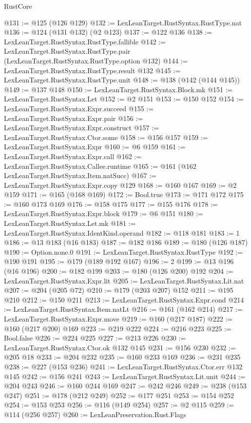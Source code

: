 \begin{lexlean}{RustCore}
\begin{coremodule}
@131 := @125 (@126 @129)
@132 := LexLeanTarget.RustSyntax.RustType.nat
@136 := @124 (@131 @132) (@2 @123)
@137 := @122 @136
@138 := LexLeanTarget.RustSyntax.RustType.fallible
@142 := LexLeanTarget.RustSyntax.RustType.pair (LexLeanTarget.RustSyntax.RustType.option @132)
@144 := LexLeanTarget.RustSyntax.RustType.result @132
@145 := LexLeanTarget.RustSyntax.RustType.unit
@148 := @138 (@142 (@144 @145))
@149 := @137 @148
@150 := LexLeanTarget.RustSyntax.Block.mk
@151 := LexLeanTarget.RustSyntax.Let
@152 := @2 @151
@153 := @150 @152
@154 := LexLeanTarget.RustSyntax.Expr.succeed
@155 := LexLeanTarget.RustSyntax.Expr.pair
@156 := LexLeanTarget.RustSyntax.Expr.construct
@157 := LexLeanTarget.RustSyntax.Ctor.some
@158 := @156 @157
@159 := LexLeanTarget.RustSyntax.Expr
@160 := @6 @159
@161 := LexLeanTarget.RustSyntax.Expr.call
@162 := LexLeanTarget.RustSyntax.Callee.runtime
@165 := @161 (@162 LexLeanTarget.RustSyntax.Item.natSucc)
@167 := LexLeanTarget.RustSyntax.Expr.copy @129
@168 := @160 @167
@169 := @2 @159
@171 := @165 (@168 @169)
@172 := Bool.true
@173 := @171 @172
@175 := @160 @173 @169
@176 := @158 @175
@177 := @155 @176
@178 := LexLeanTarget.RustSyntax.Expr.block
@179 := @6 @151
@180 := LexLeanTarget.RustSyntax.Let.mk
@181 := LexLeanTarget.RustSyntax.IdentKind.operand
@182 := @118 @181
@183 := 1
@186 := @13 @183 (@16 @183)
@187 := @182 @186
@189 := @180 (@126 @187)
@190 := Option.none.{0}
@191 := LexLeanTarget.RustSyntax.RustType
@192 := @190 @191
@195 := @179 (@189 @192 @167)
@196 := 2
@199 := @13 @196 (@16 @196)
@200 := @182 @199
@203 := @180 (@126 @200) @192
@204 := LexLeanTarget.RustSyntax.Expr.lit
@205 := LexLeanTarget.RustSyntax.Lit.nat
@207 := @204 (@205 @72)
@210 := @179 (@203 @207) @152
@211 := @195 @210
@212 := @150 @211
@213 := LexLeanTarget.RustSyntax.Expr.cond
@214 := LexLeanTarget.RustSyntax.Item.natLt
@216 := @161 (@162 @214)
@217 := LexLeanTarget.RustSyntax.Expr.move
@219 := @160 (@217 @187)
@222 := @160 (@217 @200) @169
@223 := @219 @222
@224 := @216 @223
@225 := Bool.false
@226 := @224 @225
@227 := @213 @226
@230 := LexLeanTarget.RustSyntax.Ctor.ok @132 @145
@231 := @156 @230
@232 := @205 @18
@233 := @204 @232
@235 := @160 @233 @169
@236 := @231 @235
@238 := @227 (@153 @236)
@241 := LexLeanTarget.RustSyntax.Ctor.err @132 @145
@242 := @156 @241
@243 := LexLeanTarget.RustSyntax.Lit.unit
@244 := @204 @243
@246 := @160 @244 @169
@247 := @242 @246
@249 := @238 (@153 @247)
@251 := @178 (@212 @249)
@252 := @177 @251
@253 := @154 @252
@254 := @153 @253
@256 := @116 (@149 @254)
@257 := @2 @115
@259 := @114 (@256 @257)
@260 := LexLeanPreservation.Rust.Flags

\end{coremodule}
\end{lexlean}
